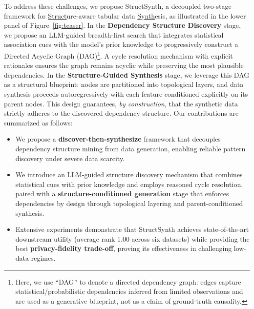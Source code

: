 To address these challenges, we propose \textsf{StructSynth}, a decoupled two-stage framework for \underline{Struct}ure-aware tabular data \underline{Synth}esis, as illustrated in the lower panel of Figure~\ref{fig:teaser}.
In the \textbf{Dependency Structure Discovery} stage, we propose an LLM-guided breadth-first search that integrates statistical association cues 
with the model's prior knowledge to progressively construct a Directed Acyclic Graph (DAG)\footnote{Here, we use ``DAG'' to denote a directed dependency graph: edges capture statistical/probabilistic dependencies inferred from limited observations and are used as a generative blueprint, not as a claim of ground-truth causality.}. A cycle resolution mechanism with explicit rationales ensures the graph remains acyclic while preserving the most plausible dependencies.
In the \textbf{Structure-Guided Synthesis} stage, we leverage this DAG as a structural blueprint: nodes are partitioned into topological layers, and data synthesis proceeds autoregressively with each feature conditioned explicitly on its parent nodes. This design guarantees, \textit{by construction}, that the synthetic data strictly adheres to the discovered dependency structure.
Our contributions are summarized as follows:
\begin{itemize}[leftmargin=*]
    \item We propose a \textbf{discover-then-synthesize} framework that decouples dependency structure mining from data generation, enabling reliable pattern discovery under severe data scarcity.
    \item We introduce an LLM-guided structure discovery mechanism that combines statistical cues with prior knowledge and employs reasoned cycle resolution, paired with a \textbf{structure-conditioned generation} stage that enforces dependencies by design through topological layering and parent-conditioned synthesis.
    \item Extensive experiments demonstrate that \textsf{StructSynth} achieves state-of-the-art downstream utility (average rank 1.00 across six datasets) while providing the best \textbf{privacy-fidelity trade-off}, proving its effectiveness in challenging low-data regimes.
\end{itemize}

